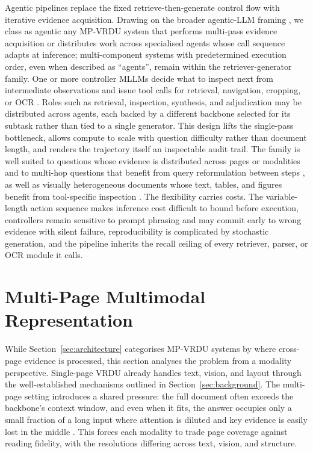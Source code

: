 \documentclass[11pt]{article}
\begin{document}
Agentic pipelines replace the fixed retrieve-then-generate control flow with iterative evidence acquisition. Drawing on the broader agentic-LLM framing \cite{plaat2025agentic, wang2024survey}, we class as agentic any MP-VRDU system that performs multi-pass evidence acquisition or distributes work across specialised agents whose call sequence adapts at inference; multi-component systems with predetermined execution order, even when described as ``agents'', remain within the retriever-generator family. One or more controller MLLMs decide what to inspect next from intermediate observations and issue tool calls for retrieval, navigation, cropping, or OCR \cite{zheng2026docv, sun2025docagent}. Roles such as retrieval, inspection, synthesis, and adjudication may be distributed across agents, each backed by a different backbone selected for its subtask \cite{han2025mdocagent} rather than tied to a single generator. This design lifts the single-pass bottleneck, allows compute to scale with question difficulty rather than document length, and renders the trajectory itself an inspectable audit trail. The family is well suited to questions whose evidence is distributed across pages or modalities and to multi-hop questions that benefit from query reformulation between steps \cite{wang2025vidorag, sun2025docagent}, as well as visually heterogeneous documents whose text, tables, and figures benefit from tool-specific inspection \cite{han2025mdocagent, zhu2025doclens}. The flexibility carries costs. The variable-length action sequence makes inference cost difficult to bound before execution, controllers remain sensitive to prompt phrasing and may commit early to wrong evidence with silent failure, reproducibility is complicated by stochastic generation, and the pipeline inherits the recall ceiling of every retriever, parser, or OCR module it calls.

\section{Multi-Page Multimodal Representation}
\label{sec:modality}

While Section~\ref{sec:architecture} categorises MP-VRDU systems by where cross-page evidence is processed, this section analyses the problem from a modality perspective. Single-page VRDU already handles text, vision, and layout through the well-established mechanisms outlined in Section~\ref{sec:background}. The multi-page setting introduces a shared pressure: the full document often exceeds the backbone's context window, and even when it fits, the answer occupies only a small fraction of a long input where attention is diluted and key evidence is easily lost in the middle \cite{liu2024lost}. This forces each modality to trade page coverage against reading fidelity, with the resolutions differing across text, vision, and structure.
\end{document}
